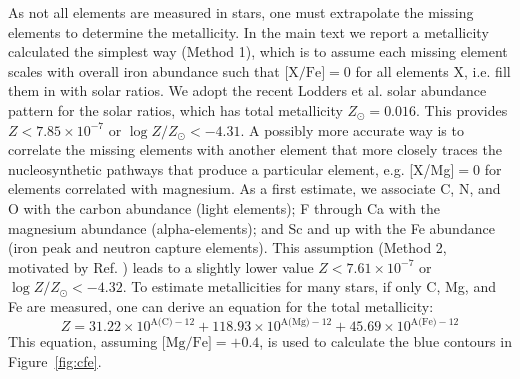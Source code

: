 \documentclass{natureprintstyle}
\newcommand{\logzzsun}{\ensuremath{\log Z/Z_\odot}\xspace}
\begin{document}
As not all elements are measured in stars, one must extrapolate the missing elements to determine the metallicity.
In the main text we report a metallicity calculated the simplest way (Method 1), which is to assume each missing element scales with overall iron abundance such that $\mbox{[X/Fe]}=0$ for all elements X, i.e. fill them in with solar ratios.
We adopt the recent Lodders et al.\cite{Lodders2025} solar abundance pattern for the solar ratios, which has total metallicity $Z_\odot=0.016$.
This provides $Z < 7.85 \times 10^{-7}$ or $\logzzsun < -4.31$.
A possibly more accurate way is to correlate the missing elements with another element that more closely traces the nucleosynthetic pathways that produce a particular element, e.g. [X/Mg]$=0$ for elements correlated with magnesium.
As a first estimate, we associate C, N, and O with the carbon abundance (light elements); F through Ca with the magnesium abundance (alpha-elements); and Sc and up with the Fe abundance (iron peak and neutron capture elements).
This assumption (Method 2, motivated by Ref. \cite{Caffau2024}) leads to a slightly lower value $Z < 7.61 \times 10^{-7}$ or $\logzzsun < -4.32$.
To estimate metallicities for many stars, if only C, Mg, and Fe are measured, one can derive an equation for the total metallicity:
\begin{equation*}
    Z = 31.22 \times 10^{\text{A(C)}-12} + 118.93 \times 10^{\text{A(Mg)}-12} + 45.69 \times 10^{\text{A(Fe)}-12}
\end{equation*}
This equation, assuming $\mbox{[Mg/Fe]}=+0.4$, is used to calculate the blue contours in Figure~\ref{fig:cfe}.
\end{document}
